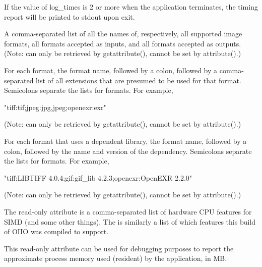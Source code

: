 If the value of {\cf log_times} is 2 or more when the application terminates,
the timing report will be printed to {\cf stdout} upon exit.
\apiend

\vspace{10pt}
  
A comma-separated list of all the names of, respectively, all supported
image formats, all formats accepted as inputs, and all formats accepted
as outputs.  (Note: can only be retrieved
by {\cf getattribute()}, cannot be set by {\cf attribute()}.)
\apiend

\vspace{10pt}
For each format, the format name, followed by a colon, followed by
a comma-separated list of all extensions that are presumed to be used
for that format.  Semicolons separate the lists for formats.  For
example,
\begin{code}
     "tiff:tif;jpeg:jpg,jpeg;openexr:exr"
\end{code}
(Note: can only be retrieved
by {\cf getattribute()}, cannot be set by {\cf attribute()}.)
\apiend

\vspace{10pt}
For each format that uses a dependent library, the format name, followed by
a colon, followed by the name and version of the dependency. Semicolons
separate the lists for formats.  For example,
\begin{code}
     "tiff:LIBTIFF 4.0.4;gif:gif_lib 4.2.3;openexr:OpenEXR 2.2.0"
\end{code}
(Note: can only be retrieved by {\cf getattribute()}, cannot be set by
{\cf attribute()}.)
\apiend

\vspace{10pt}
 
The  read-only attribute is a comma-separated list of
hardware CPU features for SIMD (and some other things). The 
is similarly a list of which features this build of OIIO was compiled
to support.
\apiend

\vspace{10pt}
This read-only attribute can be used for debugging purposes to report
the approximate process memory used (resident) by the application, in MB.
\apiend

